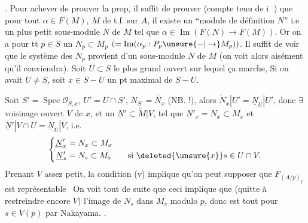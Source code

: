 . Pour achever de prouver la prop, il suffit de prouver (compte tenu de \textcircled{\scriptsize i} ) que pour tout $\alpha\in F(M)$, $M$ de t.f. sur $A$, il existe un ``module de définition $N$'' i.e un plus petit sous-module $N$ de $M$ tel que $\alpha\in\operatorname{Im}(F(N)\to F(M))$. Or on a pour tt $p\in S$ un $N_p\subset M_p$ $(=\operatorname{Im}(\alpha_p:P_p\unsure{-|\to} M_p))$.  Il suffit de voir que le système des $N_p$ provient d'un sous-module $N$ de $M$ (on voit alors aisément qu'il conviendra). Soit $U\subset S$ le plus grand ouvert sur lequel ça marche,  Si on avait $U\ne S$, soit $x\in S-U$  un pt maximal de $S-U$.

  Soit $S'=\operatorname{Spec}\mathcal O_{S,x}$, $U'=U\cap S'$,  $N_{S'}=\widetilde{N_x}$ (NB.  !), alors $\widetilde N_x|U'=\underline N_U|U'$, donc $\exists$ voisinage ouvert $V$ de $x$,  et un $\underline{N}'\subset\widetilde M|V$, tel que $\underline N'_x=N_x\subset M_x$ et $\underline N'|V\cap U=\underline N_U|V$, i.e.
\[
\left\{\begin{aligned}
\underline N'_x&=N_x\subset M_x\\
\underline N'_s&=N_s\subset M_s\qquad\text{si }\deleted{\unsure{x}}s\in U\cap V.
\end{aligned}\right.
\]
Prenant $V$ assez petit,    la condition (v) implique qu'on peut supposer que $F_{(A/p)_f}$ est représentable\   On voit tout de suite que ceci implique que (quitte à restreindre encore $V$) l'image de $N_s$ dans $M_s$   modulo $p$, donc est tout pour $s\in V(p)$ par Nakayama. .

